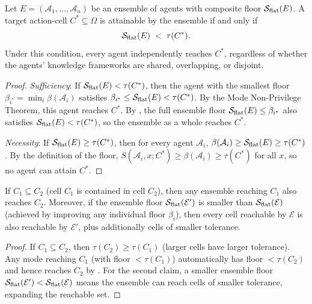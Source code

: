 \begin{theorem}
\label{thm:common-action-cell}
Let $E = (\mathcal{A}_1, \ldots, \mathcal{A}_n)$ be an ensemble of agents
with composite floor $\mathcal{S}_{\mathrm{flat}}(E)$.  A target action-cell $C^* \subseteq \Omega$
is attainable by the ensemble if and only if
\[
  \mathcal{S}_{\mathrm{flat}}(E) \;<\; \tau(C^*).
\]
Under this condition, every agent independently reaches $C^*$, regardless of
whether the agents' knowledge frameworks are shared, overlapping, or disjoint.
\end{theorem}

\begin{proof}
\textit{Sufficiency}: If $\mathcal{S}_{\mathrm{flat}}(E) < \tau(C^*)$, then the agent with
the smallest floor $\beta_{i^*} = \min_i \beta(\mathcal{A}_i)$ satisfies
$\beta_{i^*} \leq \mathcal{S}_{\mathrm{flat}}(E) < \tau(C^*)$.  By the Mode Non-Privilege
Theorem, this agent reaches $C^*$.  By ,
the full ensemble floor $\mathcal{S}_{\mathrm{flat}}(E) \leq \beta_{i^*}$ also satisfies
$\mathcal{S}_{\mathrm{flat}}(E) < \tau(C^*)$, so the ensemble as a whole reaches $C^*$.

\textit{Necessity}: If $\mathcal{S}_{\mathrm{flat}}(E) \geq \tau(C^*)$, then for every
agent $\mathcal{A}_i$, $\beta(\mathcal{A}_i) \geq \mathcal{S}_{\mathrm{flat}}(E) \geq \tau(C^*)$.
By the definition of the floor, $S(\mathcal{A}_i, x; C^*) \geq \beta(\mathcal{A}_i) \geq
\tau(C^*)$ for all $x$, so no agent can attain $C^*$.
\end{proof}

\begin{theorem}
\label{thm:reachability-monotonicity}
If $C_1 \subseteq C_2$ (cell $C_1$ is contained in cell $C_2$), then any
ensemble reaching $C_1$ also reaches $C_2$.  Moreover, if the ensemble floor
$\mathcal{S}_{\mathrm{flat}}(\mathcal{E}')$ is smaller than $\mathcal{S}_{\mathrm{flat}}(\mathcal{E})$
(achieved by improving any individual floor $\beta_i$), then every cell
reachable by $\mathcal{E}$ is also reachable by $\mathcal{E}'$, plus
additionally cells of smaller tolerance.
\end{theorem}

\begin{proof}
If $C_1 \subseteq C_2$, then $\tau(C_2) \geq \tau(C_1)$ (larger cells have
larger tolerance).  Any mode reaching $C_1$ (with floor $< \tau(C_1)$)
automatically has floor $< \tau(C_2)$ and hence reaches $C_2$ by
.  For the second claim, a smaller ensemble floor
$\mathcal{S}_{\mathrm{flat}}(\mathcal{E}') < \mathcal{S}_{\mathrm{flat}}(\mathcal{E})$ means the
ensemble can reach cells of smaller tolerance, expanding the reachable set.
\end{proof}

